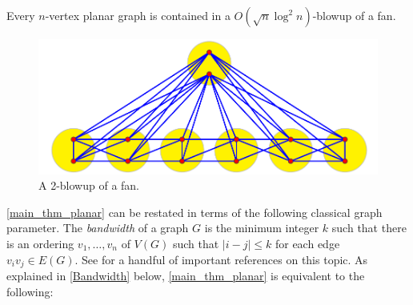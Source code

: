 \documentclass{patmorin}
\renewcommand{\leq}{\leqslant}
\newcommand{\david}[1]{{\color{orange} David: #1}}
\newcommand{\pat}[1]{\textcolor{Blue}{Pat: #1}}
\newcommand{\gwen}[1]{\textcolor{Purple}{Gwen: #1}}
\newcommand{\defin}[1]{\emph{\textcolor{brightmaroon}{#1}}}
\begin{document}
\begin{thm}\label{main_thm_planar}
  Every $n$-vertex planar graph is contained in a $O(\sqrt{n}\log^2 n)$-blowup of a fan.
\end{thm}

\begin{figure}[h]
   \includegraphics{figs/FanPartition}
    \caption{A 2-blowup of a fan.}
    \label{2blowup}
\end{figure}




\cref{main_thm_planar} can be restated in terms of the following classical graph parameter. The \defin{bandwidth} of a graph $G$ is the minimum integer $k$ such that there is an ordering $v_1,\dots,v_n$ of $V(G)$ such that $|i-j|\leq k$ for each edge $v_iv_j\in E(G)$. See \citep{CS89,ST20,ABET20,BPTW10,rao:small,BST09,feige:approximating} for a handful of important references on this topic. As explained in \cref{Bandwidth} below, \cref{main_thm_planar} is equivalent to the following:
\end{document}
